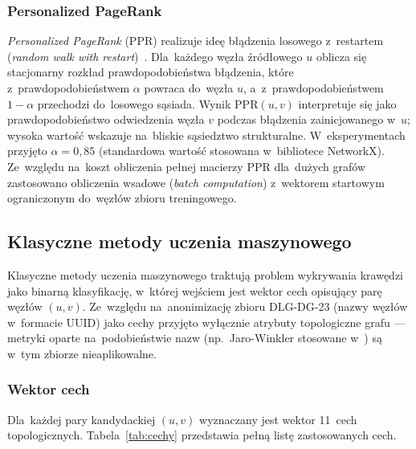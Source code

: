 \subsubsection{Personalized PageRank}

\emph{Personalized PageRank} (PPR) realizuje ideę błądzenia losowego
z~restartem (\emph{random walk with restart})~\cite{LibenNowell2007}.
Dla~każdego węzła źródłowego $u$ oblicza się stacjonarny rozkład
prawdopodobieństwa błądzenia, które z~prawdopodobieństwem $\alpha$
powraca do~węzła $u$, a~z~prawdopodobieństwem $1 - \alpha$ przechodzi
do~losowego sąsiada. Wynik $\mathrm{PPR}(u, v)$ interpretuje się
jako prawdopodobieństwo odwiedzenia węzła $v$ podczas błądzenia
zainicjowanego w~$u$; wysoka wartość wskazuje na~bliskie sąsiedztwo
strukturalne. W~eksperymentach przyjęto $\alpha = 0{,}85$ (standardowa
wartość stosowana w~bibliotece NetworkX). Ze~względu na~koszt obliczenia
pełnej macierzy PPR dla~dużych grafów zastosowano obliczenia wsadowe
(\emph{batch computation}) z~wektorem startowym ograniczonym
do~węzłów zbioru treningowego.

\subsection{Klasyczne metody uczenia maszynowego}
\label{sec:ml}

Klasyczne metody uczenia maszynowego traktują problem wykrywania krawędzi
jako binarną klasyfikację, w~której wejściem jest wektor cech opisujący
parę węzłów $(u, v)$. Ze~względu na~anonimizację zbioru DLG-DG-23
(nazwy węzłów w~formacie UUID) jako cechy przyjęto wyłącznie atrybuty
topologiczne grafu — metryki oparte na~podobieństwie nazw (np.~Jaro-Winkler
stosowane w~\cite{Boinski2025}) są w~tym zbiorze nieaplikowalne.

\subsubsection{Wektor cech}

Dla~każdej pary kandydackiej $(u, v)$ wyznaczany jest wektor
11~cech topologicznych. Tabela~\ref{tab:cechy} przedstawia pełną
listę zastosowanych cech.


